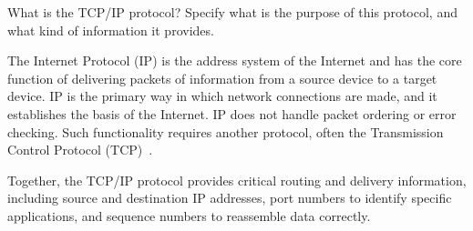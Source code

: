 \item[\textbf{Problem 11}]
What is the TCP/IP protocol? Specify what is the purpose of this protocol, and
what kind of information it provides.

\Solution

The Internet Protocol (IP) is the address system of the Internet and has the
core function of delivering packets of information from a source device to a
target device. IP is the primary way in which network connections are made, and
it establishes the basis of the Internet. IP does not handle packet ordering or
error checking. Such functionality requires another protocol, often the
Transmission Control Protocol (TCP)~\cite{cloudflare_tcp_ip}.

Together, the TCP/IP protocol provides critical routing and delivery
information, including source and destination IP addresses, port numbers to
identify specific applications, and sequence numbers to reassemble data
correctly.
